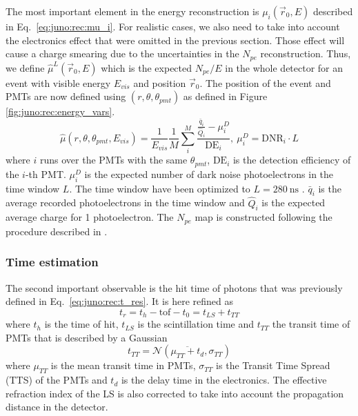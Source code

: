 \documentclass[../main.tex]{subfiles}
\begin{document}
The most important element in the energy reconstruction is $\mu_i(\vec{r}_0, E)$ described in Eq.\ \ref{eq:juno:rec:mu_i}. For realistic cases, we also need to take into account the electronics effect that were omitted in the previous section. Those effect will cause a charge smearing due to the uncertainties in the $N_{pe}$ reconstruction. Thus, we define $\hat{\mu}^L(\vec{r}_0, E)$ which is the expected $N_{pe}/E$ in the whole detector for an event with visible energy $E_{vis}$ and position $\vec{r}_0$. The position of the event and PMTs are now defined using $(r, \theta, \theta_{pmt})$ as defined in Figure \ref{fig:juno:rec:energy_vars}.
\begin{equation}
  \label{eq:juno:reco:charge_est}
  \hat{\mu}(r, \theta, \theta_{pmt}, E_{vis}) = \frac{1}{E_{vis}} \frac{1}{M} \sum_i^M\frac{\frac{\bar{q}_i}{\hat{Q}_i} - \mu_i^D}{\mathrm{DE}_i}, ~ \mu_i^D = \mathrm{DNR}_i \cdot L
\end{equation}
where $i$ runs over the PMTs with the same $\theta_{pmt}$, $\mathrm{DE}_i$ is the detection efficiency of the $i$-th PMT. $\mu_i^D$ is the expected number of dark noise photoelectrons in the time window $L$. The time window have been optimized to $L = 280 ~ \mathrm{ns}$ \cite{huang_data-driven_2023}. $\bar{q}_i$ is the average recorded photoelectrons in the time window and $\hat{Q}_i$ is the expected average charge for 1 photoelectron. The $N_{pe}$ map is constructed following the procedure described in \cite{huang_improving_2021}.

\subsubsection{Time estimation}

The second important observable is the hit time of photons that was previously defined in Eq.\ \ref{eq:juno:rec:t_res}. It is here refined as
\begin{equation}
  t_r = t_h - \mathrm{tof} - t_0 = t_{LS} + t_{TT}
\end{equation}
where $t_h$ is the time of hit, $t_{LS}$ is the scintillation time and $t_{TT}$ the transit time of PMTs that is described by a Gaussian
\begin{equation}
  t_{TT} = \mathcal{N}(\overline{\mu_{TT} + t_{d}}, \sigma_{TT})
\end{equation}
where $\mu_{TT}$ is the mean transit time in PMTs, $\sigma_{TT}$ is the Transit Time Spread (TTS) of the PMTs and $t_{d}$ is the delay time in the electronics. The effective refraction index of the LS is also corrected to take into account the propagation distance in the detector.
\end{document}
